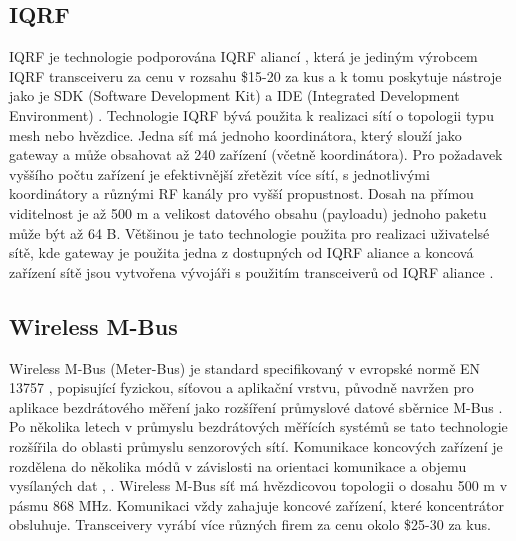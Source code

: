 \subsection{IQRF}
IQRF je technologie podporována IQRF aliancí \cite{iqrf_alliance}, která je jediným výrobcem IQRF transceiveru \cite{iqrf_transceivers} za cenu v rozsahu \$15-20 za kus a k tomu poskytuje nástroje jako je SDK (Software Development Kit) \cite{iqrf_sdk} a IDE (Integrated Development Environment) \cite{iqrf_ide}.
Technologie IQRF bývá použita k realizaci sítí o topologii typu mesh nebo hvězdice.
Jedna síť má jednoho koordinátora, který slouží jako gateway a může obsahovat až 240 zařízení (včetně koordinátora). Pro požadavek vyššího počtu zařízení je efektivnější zřetězit více sítí, s jednotlivými koordinátory a různými RF kanály pro vyšší propustnost.
Dosah na přímou viditelnost je až 500 m a velikost datového obsahu (payloadu) jednoho paketu může být až 64 B.
Většinou je tato technologie použita pro realizaci uživatelsé sítě, kde gateway je použita jedna z dostupných od IQRF aliance a koncová zařízení sítě jsou vytvořena vývojáři s použitím transceiverů od IQRF aliance
\cite{paper_iqrf}.


\subsection{Wireless M-Bus}
Wireless M-Bus (Meter-Bus) je standard specifikovaný v evropské normě EN 13757 \cite{EN 13757}, popisující fyzickou, síťovou a aplikační vrstvu, původně navržen pro aplikace bezdrátového měření jako rozšíření průmyslové datové sběrnice M-Bus \cite{wirelessMBus_automatizace}.
Po několika letech v průmyslu bezdrátových měřících systémů se tato technologie rozšířila do oblasti průmyslu senzorových sítí.
Komunikace koncových zařízení je rozdělena do několika módů v závislosti na orientaci komunikace a objemu vysílaných dat \cite{wirelessMBus01}, \cite{wirelessMBus02}. 
Wireless M-Bus síť má hvězdicovou topologii o dosahu 500 m v pásmu 868 MHz.
Komunikaci vždy zahajuje koncové zařízení, které koncentrátor obsluhuje.
Transceivery vyrábí více různých firem za cenu okolo \$25-30 za kus.


